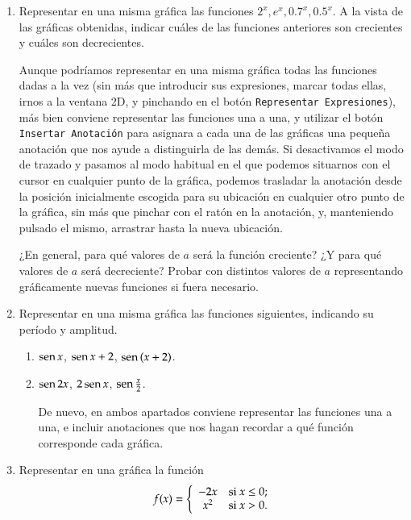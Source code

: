 \begin{enumerate}[leftmargin=*]
\item Representar en una misma gráfica las funciones $2^{x}, e^{x}, 0.7^{x}, 0.5^{x}$. A la vista de las gráficas obtenidas, indicar cuáles
de las funciones anteriores son crecientes y cuáles son decrecientes.
\begin{indicacion}
Aunque podríamos representar en una misma gráfica todas las funciones dadas a la vez  (sin más que introducir sus expresiones, marcar
todas ellas, irnos a la ventana 2D, y pinchando en el botón \texttt{Representar Expresiones}), más bien conviene representar las funciones
una a una, y utilizar el botón \texttt{Insertar Anotación} para asignara a cada una de las gráficas una pequeña anotación que nos ayude a
distinguirla de las demás. Si desactivamos el modo de trazado y pasamos al modo habitual en el que podemos situarnos con el cursor en
cualquier punto de la gráfica, podemos trasladar la anotación desde la posición inicialmente escogida para su ubicación en cualquier otro
punto de la gráfica, sin más que pinchar con el ratón en la anotación, y, manteniendo pulsado el mismo, arrastrar hasta la nueva ubicación.
\end{indicacion}

¿En general, para qué valores de $a$ será la función creciente? ¿Y para qué valores de $a$ será decreciente? Probar con
distintos valores de $a$ representando gráficamente nuevas funciones si fuera necesario.


\item Representar en una misma gráfica las funciones siguientes, indicando su período y amplitud.
\begin{enumerate}
\item $\operatorname{sen}{x}$, $\operatorname{sen}{x}+2$, $\operatorname{sen}{(x+2)}$.
\item $\operatorname{sen}{2x}$, $2\operatorname{sen}{x}$, $\operatorname{sen}\frac{x}{2}$.
\begin{indicacion}
De nuevo, en ambos apartados conviene representar las funciones una a una, e incluir anotaciones que nos hagan recordar a qué función
corresponde cada gráfica.
\end{indicacion}
\end{enumerate}


\item Representar en una gráfica la función
\[
\ f(x)=\left\{
\begin{array}{cl}
-2x & \hbox{si $x\leq0$;} \\
x^{2} & \hbox{si $x>0$.} \\
\end{array}
\right.
\]


\end{enumerate}
